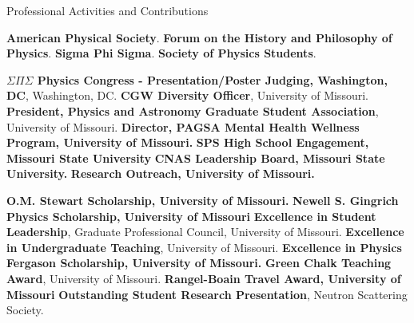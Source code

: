 \begin{rubric}{Professional Activities and Contributions}

\entry*[2019--Present] \textbf{American Physical Society}.
\entry*[2020--Present] \textbf{Forum on the History and Philosophy of Physics}.
\entry*[2022--Present] \textbf{Sigma Phi Sigma}.
\entry*[2017--2021] \textbf{Society of Physics Students}.

\entry*[2022] \textbf{$\Sigma \Pi \Sigma$ Physics Congress - Presentation/Poster Judging, Washington, DC}, Washington, DC.
\entry*[2022--Present] \textbf{CGW Diversity Officer}, University of Missouri.
\entry*[2022--Present] \textbf{President, Physics and Astronomy Graduate Student Association}, University of Missouri.
\entry*[2022-2024] \textbf{Director, PAGSA Mental Health Wellness Program, University of Missouri.}
\entry*[2017-2020] \textbf{SPS High School Engagement, Missouri State University}
\entry*[2018-2019] \textbf{CNAS Leadership Board, Missouri State University.}
\entry*[2022-2024] \textbf{ Research Outreach, University of Missouri.}

\entry*[2021] \textbf{O.M. Stewart Scholarship, University of Missouri.}
\entry*[2022] \textbf{Newell S. Gingrich Physics Scholarship, University of Missouri}
\entry*[2022] \textbf{Excellence in Student Leadership}, Graduate Professional Council, University of Missouri.
\entry*[2022] \textbf{Excellence in Undergraduate Teaching}, University of Missouri.
\entry*[2023] \textbf{Excellence in Physics Fergason Scholarship, University of Missouri.}
\entry*[2023] \textbf{Green Chalk Teaching Award}, University of Missouri.
\entry*[2023] \textbf{Rangel-Boain Travel Award, University of Missouri}
\entry*[2023] \textbf{Outstanding Student Research Presentation}, Neutron Scattering Society.

\end{rubric}


